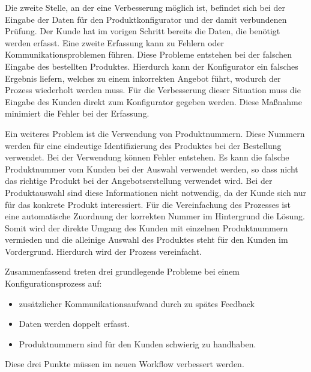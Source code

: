 Die zweite Stelle, an der eine Verbesserung möglich ist, befindet sich bei der Eingabe der Daten für den Produktkonfigurator und der damit verbundenen Prüfung. Der Kunde hat im vorigen Schritt bereits die Daten, die benötigt werden erfasst. Eine zweite Erfassung kann zu Fehlern oder Kommunikationsproblemen führen. Diese Probleme entstehen bei der falschen Eingabe des bestellten Produktes. Hierdurch kann der Konfigurator ein falsches Ergebnis liefern, welches zu einem inkorrekten Angebot führt, wodurch der Prozess wiederholt werden muss. Für die Verbesserung dieser Situation muss die Eingabe des Kunden direkt zum Konfigurator gegeben werden. Diese Maßnahme minimiert die Fehler bei der Erfassung. \par 

Ein weiteres Problem ist die Verwendung von Produktnummern. Diese Nummern werden für eine eindeutige Identifizierung des Produktes bei der Bestellung verwendet. Bei der Verwendung können Fehler entstehen. Es kann die falsche Produktnummer vom Kunden bei der Auswahl verwendet werden, so dass nicht das richtige Produkt bei der Angebotserstellung verwendet wird. Bei der Produktauswahl sind 
diese Informationen nicht notwendig, da der Kunde sich nur für das konkrete Produkt interessiert. Für die Vereinfachung des Prozesses ist eine automatische Zuordnung der korrekten Nummer im Hintergrund die Lösung. Somit wird der direkte Umgang des Kunden mit einzelnen Produktnummern vermieden und die alleinige Auswahl des Produktes steht für den Kunden im Vordergrund. Hierdurch wird der Prozess vereinfacht. \par



Zusammenfassend treten drei grundlegende Probleme bei einem Konfigurationsprozess auf:
\begin{itemize}

		\item zusätzlicher Kommunikationsaufwand durch zu spätes Feedback
        \item Daten werden doppelt erfasst.
        \item Produktnummern sind für den Kunden schwierig zu handhaben.
\end{itemize}
Diese drei Punkte müssen im neuen Workflow verbessert werden.

